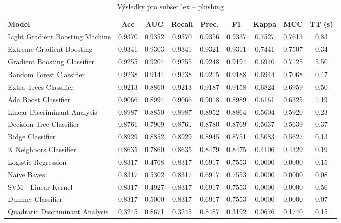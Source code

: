 \begin{table}[H]
  \centering
  \small
  \caption{Výsledky pro subset lex – phishing}
  \begin{tabular}{|l|c|c|c|c|c|c|c|c|}
    \hline
    \textbf{Model} & \textbf{Acc} & \textbf{AUC} & \textbf{Recall} & \textbf{Prec.} & \textbf{F1} & \textbf{Kappa} & \textbf{MCC} & \textbf{TT (s)} \\
    \hline
    Light Gradient Boosting Machine & 0.9370 & 0.9352 & 0.9370 & 0.9356 & 0.9337 & 0.7527 & 0.7613 & 0.83 \\
    Extreme Gradient Boosting & 0.9341 & 0.9303 & 0.9341 & 0.9321 & 0.9311 & 0.7441 & 0.7507 & 0.34 \\
    Gradient Boosting Classifier & 0.9255 & 0.9204 & 0.9255 & 0.9248 & 0.9194 & 0.6940 & 0.7125 & 5.50 \\
    Random Forest Classifier & 0.9238 & 0.9144 & 0.9238 & 0.9215 & 0.9188 & 0.6944 & 0.7068 & 0.47 \\
    Extra Trees Classifier & 0.9213 & 0.8860 & 0.9213 & 0.9187 & 0.9158 & 0.6824 & 0.6959 & 0.50 \\
    Ada Boost Classifier & 0.9066 & 0.8994 & 0.9066 & 0.9018 & 0.8989 & 0.6161 & 0.6325 & 1.19 \\
    Linear Discriminant Analysis & 0.8987 & 0.8850 & 0.8987 & 0.8952 & 0.8864 & 0.5604 & 0.5920 & 0.23 \\
    Decision Tree Classifier & 0.8761 & 0.7909 & 0.8761 & 0.8780 & 0.8769 & 0.5637 & 0.5639 & 0.37 \\
    Ridge Classifier & 0.8929 & 0.8852 & 0.8929 & 0.8945 & 0.8751 & 0.5083 & 0.5627 & 0.13 \\
    K Neighbors Classifier & 0.8635 & 0.7860 & 0.8635 & 0.8479 & 0.8475 & 0.4106 & 0.4329 & 0.19 \\
    Logistic Regression & 0.8317 & 0.4768 & 0.8317 & 0.6917 & 0.7553 & 0.0000 & 0.0000 & 0.15 \\
    Naive Bayes & 0.8317 & 0.5302 & 0.8317 & 0.6917 & 0.7553 & 0.0000 & 0.0000 & 0.08 \\
    SVM - Linear Kernel & 0.8317 & 0.4927 & 0.8317 & 0.6917 & 0.7553 & 0.0000 & 0.0000 & 0.56 \\
    Dummy Classifier & 0.8317 & 0.5000 & 0.8317 & 0.6917 & 0.7553 & 0.0000 & 0.0000 & 0.07 \\
    Quadratic Discriminant Analysis & 0.3245 & 0.8671 & 0.3245 & 0.8487 & 0.3192 & 0.0676 & 0.1740 & 0.15 \\
    \hline
  \end{tabular}
\end{table}
\vspace{0.5cm}

